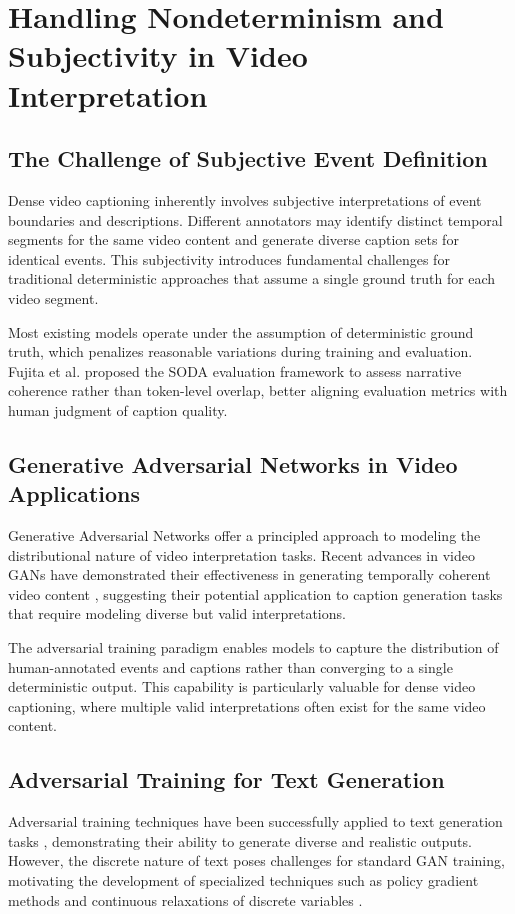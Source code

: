 \section{Handling Nondeterminism and Subjectivity in Video Interpretation}
\label{sec:nondeterminism}

\subsection{The Challenge of Subjective Event Definition}
Dense video captioning inherently involves subjective interpretations of event boundaries and descriptions.
Different annotators may identify distinct temporal segments for the same video content and generate diverse caption sets for identical events.
This subjectivity introduces fundamental challenges for traditional deterministic approaches that assume a single ground truth for each video segment.

Most existing models operate under the assumption of deterministic ground truth, which penalizes reasonable variations during training and evaluation.
Fujita et al. \cite{Fujita2020-ob} proposed the SODA evaluation framework to assess narrative coherence rather than token-level overlap, better aligning evaluation metrics with human judgment of caption quality.

\subsection{Generative Adversarial Networks in Video Applications}
Generative Adversarial Networks \cite{Goodfellow2014-hs} offer a principled approach to modeling the distributional nature of video interpretation tasks.
Recent advances in video GANs have demonstrated their effectiveness in generating temporally coherent video content \cite{Arjovsky2017-qu,Gulrajani2017-dh}, suggesting their potential application to caption generation tasks that require modeling diverse but valid interpretations.

The adversarial training paradigm enables models to capture the distribution of human-annotated events and captions rather than converging to a single deterministic output.
This capability is particularly valuable for dense video captioning, where multiple valid interpretations often exist for the same video content.

\subsection{Adversarial Training for Text Generation}
Adversarial training techniques have been successfully applied to text generation tasks \cite{Donahue2018-ez,Le2022-lz}, demonstrating their ability to generate diverse and realistic outputs.
However, the discrete nature of text poses challenges for standard GAN training, motivating the development of specialized techniques such as policy gradient methods and continuous relaxations of discrete variables \cite{Jang2017-ur,Maddison2017-se}.

